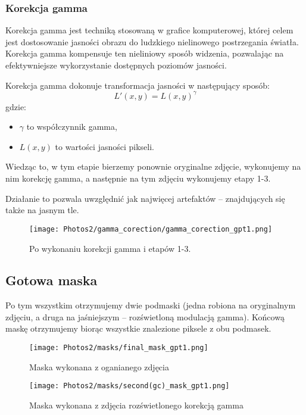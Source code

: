 \documentclass[]{mwart}
\begin{document}
\newpage
\subsubsection{Korekcja gamma}

Korekcja gamma jest techniką stosowaną w grafice komputerowej, której celem jest dostosowanie
jasności obrazu do ludzkiego nielinowego postrzegania światła. Korekcja gamma kompensuje ten
nieliniowy sposób widzenia, pozwalając na efektywniejsze wykorzystanie dostępnych poziomów jasności.

Korekcja gamma dokonuje transformacja jasności w następujący sposób:
\begin{equation}
    L'(x,y) = L(x,y)^{\gamma}
\end{equation}
gdzie:
\begin{itemize}
    \item $\gamma$ to współczynnik gamma,
    \item $L(x,y)$ to wartości jasności pikseli.
\end{itemize}

Wiedząc to, w tym etapie bierzemy ponownie oryginalne zdjęcie, wykonujemy
na nim korekcję gamma, a następnie na tym zdjęciu wykonujemy etapy 1-3.

Działanie to pozwala uwzględnić jak najwięcej artefaktów
-- znajdujących się także na jasnym tle.

\begin{figure}[H]
    \centering
    \texttt{[image: Photos2/gamma\_corection/gamma\_corection\_gpt1.png]}
    \caption{Po wykonaniu korekcji gamma i etapów 1-3.}
\end{figure}

\newpage
\subsection{Gotowa maska}
Po tym wszystkim otrzymujemy dwie podmaski (jedna robiona na oryginalnym
zdjęciu, a druga na jaśniejszym -- rozświetloną modulacją gamma).
Końcową maskę otrzymujemy biorąc wszystkie znalezione piksele z obu podmasek.

\begin{figure}[H]
    \centering
    \texttt{[image: Photos2/masks/final\_mask\_gpt1.png]}
    \caption{Maska wykonana z oganianego zdjęcia}
\end{figure}
\begin{figure}[H]
    \centering
    \texttt{[image: Photos2/masks/second(gc)\_mask\_gpt1.png]}
    \caption{Maska wykonana z zdjęcia rozświetlonego korekcją gamma}
\end{figure}
\end{document}
